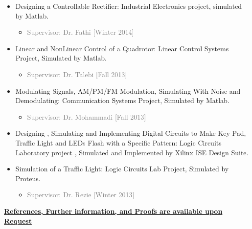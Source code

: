 \documentclass[10pt,a4paper,sans]{moderncv} %
\begin{document}
\begin{itemize}
\begin{itemize}
		\item Designing a Controllable Rectifier: Industrial Electronics project, simulated by Matlab.
		\begin{itemize}
		\item \textcolor{gray}{Supervisor: Dr. Fathi [Winter 2014]}
		\end{itemize}
		
		\item Linear and NonLinear Control of a Quadrotor: Linear Control Systems Project, Simulated by
		Matlab.
		\begin{itemize}
		\item \textcolor{gray}{Supervisor: Dr. Talebi [Fall 2013]}
		\end{itemize}
		
		\item Modulating Signals, AM/PM/FM Modulation, Simulating With Noise and Demodulating: Communication Systems Project, Simulated by Matlab.
		\begin{itemize}
		\item \textcolor{gray}{Supervisor: Dr. Mohammadi [Fall 2013]}
		\end{itemize}
		
		\item Designing , Simulating and Implementing Digital Circuits to Make Key Pad, Traffic Light and LEDs Flash with a Specific Pattern: Logic Circuits Laboratory project , Simulated and Implemented by Xilinx ISE Design Suite.
		
		\item Simulation of a Traffic Light: Logic Circuits Lab Project, Simulated by Proteus.
		\begin{itemize}
		\item \textcolor{gray}{Supervisor: Dr. Rezie [Winter 2013] \\}
		\end{itemize}
		
	\end{itemize}
\end{itemize}




\vspace{-0em}
\centerline{\underline{\textbf{	\faExclamationCircle \hspace{0.5 pt} References, Further information, and Proofs are available upon Request}}}
\end{document}
